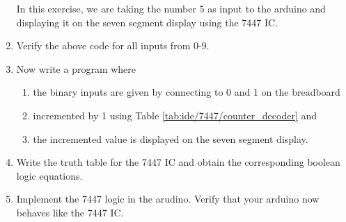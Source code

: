 \begin{enumerate}[label=\arabic*.,ref=\theenumi]
\solution
In this exercise, we are taking the number 5 as input to the arduino and displaying it on the seven segment display using the 7447 IC.
\begin{table}[H]
\centering

\caption{}
\label{table:ip_7447_ard}
\end{table}
\item
Verify the above code for all inputs from 0-9.

\item
Now write a program where 
\begin{enumerate}
\item the binary inputs are given by
connecting to 0 and 1 on the breadboard
\item incremented by 1 using Table \ref{tab:ide/7447/counter_decoder} and
\item the incremented value is displayed on the seven segment display.
\end{enumerate}

\item
Write the truth table for the 7447 IC and obtain the corresponding boolean logic equations. 

\item
Implement the 7447 logic in the arudino.  Verify that your arduino now behaves like the 7447 IC.
	\end{enumerate}
